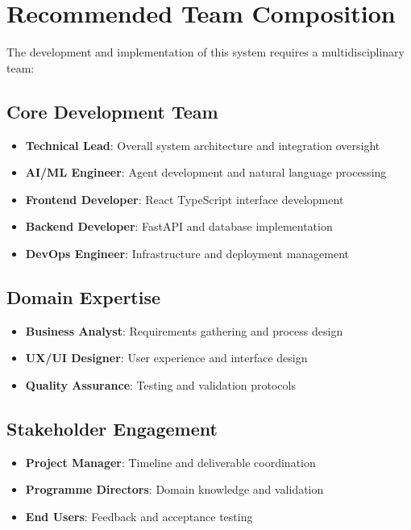 \documentclass{article}
\begin{document}
\section{Recommended Team Composition}
The development and implementation of this system requires a multidisciplinary team:

\subsection{Core Development Team}
\begin{itemize}
    \item \textbf{Technical Lead}: Overall system architecture and integration oversight
    \item \textbf{AI/ML Engineer}: Agent development and natural language processing
    \item \textbf{Frontend Developer}: React TypeScript interface development
    \item \textbf{Backend Developer}: FastAPI and database implementation
    \item \textbf{DevOps Engineer}: Infrastructure and deployment management
\end{itemize}

\subsection{Domain Expertise}
\begin{itemize}
    \item \textbf{Business Analyst}: Requirements gathering and process design
    \item \textbf{UX/UI Designer}: User experience and interface design
    \item \textbf{Quality Assurance}: Testing and validation protocols
\end{itemize}

\subsection{Stakeholder Engagement}
\begin{itemize}
    \item \textbf{Project Manager}: Timeline and deliverable coordination
    \item \textbf{Programme Directors}: Domain knowledge and validation
    \item \textbf{End Users}: Feedback and acceptance testing
\end{itemize}
\end{document}
